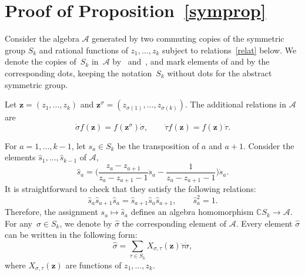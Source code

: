 \documentclass[10pt,a4paper]{amsart}
\numberwithin{equation}{section}
\begin{document}
\section{Proof of Proposition~\ref{symprop}}
\label{section6}
Consider the algebra $\mathcal{A}$ generated by two commuting copies of the symmetric group $S_k$ and rational functions of $z_1,\dots,z_k$ subject to relations~\eqref{relat} below. We denote the copies of~$S_k$ in~$\mathcal{A}$ by~ and~, and mark elements of  and  by the corresponding dots, keeping the notation~$S_k$ without dots for the abstract symmetric group.

Let $\boldsymbol{z}=(z_1,\dots,z_k)$ and $\boldsymbol{z}^\sigma=(z_{\sigma(1)},\dots,z_{\sigma(k)})$. The additional relations in $\mathcal{A}$ are
\begin{equation}\label{relat}
\dot\sigma f(\boldsymbol{z})=f(\boldsymbol{z}^\sigma) \dot\sigma,\qquad \ddot\tau f(\boldsymbol{z})=f(\boldsymbol{z}) \ddot \tau.
\end{equation}

For $a=1,\dots,k-1$, let $s_a\in S_k$ be the transposition of $a$ and $a+1$. Consider the elements $\hat{s}_1,\dots,\hat{s}_{k-1}$ of $\mathcal{A}$,
\begin{equation}\label{shat}
\hat{s}_a=\biggl(\frac{z_a-z_{a+1}}{z_a-z_{a+1}-1}\ddot s_a-\frac{1}{z_a-z_{a+1}-1}\biggr)\dot s_a.
\end{equation}
It is straightforward to check that they satisfy the following relations:
\begin{equation*}
\hat{s}_a\hat{s}_{a+1}\hat{s}_a=\hat{s}_{a+1}\hat{s}_a\hat{s}_{a+1},\qquad \hat{s}_a^2=1.
\end{equation*}
Therefore, the assignment $s_a\mapsto \hat{s}_a$ defines an algebra homomorphism $\mathbb{C}S_k\rightarrow \mathcal{A}$. For any~${\sigma\in S_k}$, we denote by $\hat{\sigma}$ the corresponding element of $ \mathcal{A}$. Every element $\hat{\sigma}$ can be written in the following form:
\begin{equation}\label{sighat}
\hat{\sigma}=\sum_{\tau\in S_k} X_{\sigma,\tau}(\boldsymbol{z}) \ddot \tau \dot \sigma,
\end{equation}
where $X_{\sigma,\tau}(\boldsymbol{z})$ are functions of $z_1,\dots,z_k$.
\end{document}
